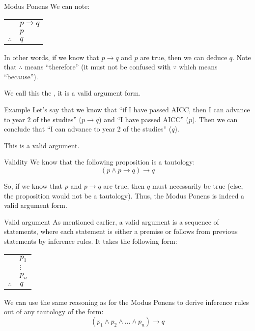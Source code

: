 \documentclass{article}
\begin{document}
\begin{parag}{Modus Ponens}
    We can note:
    \begin{center}
    \begin{tabular}{rl}
        & $p \to q$ \\
        & $p$ \\
        \hline
        $\therefore$ & $q$
    \end{tabular}
    \end{center}
    
    In other words, if we know that $p\to q$ and $p$ are true, then we can deduce $q$. Note that $\therefore$ means ``therefore'' (it must not be confused with $\because$ which means ``because''). 
    
    We call this the , it is a valid argument form.

    \begin{subparag}{Example}
        Let's say that we know that ``if I have passed AICC, then I can advance to year 2 of the studies'' ($p \to q$) and ``I have passed AICC'' ($p$). Then we can conclude that ``I can advance to year 2 of the studies'' ($q$). 

        This is a valid argument.
    \end{subparag}
    
    \begin{subparag}{Validity}
        We know that the following proposition is a tautology:
        \[\left(p \land p \to q\right) \to q\]

        So, if we know that $p$ and $p \to q$ are true, then $q$ must necessarily be true (else, the proposition would not be a tautology). Thus, the Modus Ponens is indeed a valid argument form.
    \end{subparag}
    
\end{parag}

\begin{parag}{Valid argument}
    As mentioned earlier, a valid argument is a sequence of statements, where each statement is either a premise or follows from previous statements by inference rules. It takes the following form:
    \begin{center}
    \begin{tabular}{rl}
        & $p_1$ \\
        & $\vdots$  \\
        & $p_n$ \\
        \hline
        $\therefore$ & $q$
    \end{tabular}
    \end{center}

    We can use the same reasoning as for the Modus Ponens to derive inference rules out of any tautology of the form: 
    \[\left(p_1 \land p_2 \land \ldots \land p_n\right) \to q\]
\end{parag}
\end{document}
